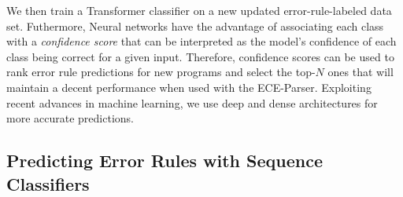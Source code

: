 We then train a Transformer classifier on a new updated error-rule-labeled data
set. Futhermore, Neural networks have the advantage of associating each class
with a \emph{confidence score} that can be interpreted as the model's confidence
of each class being correct for a given input. Therefore, confidence scores can
be used to rank error rule predictions for new programs and select the top-$N$
ones that will maintain a decent performance when used with the ECE-Parser.
Exploiting recent advances in machine learning, we use deep and dense
architectures \citep{Schmidhuber_2015} for more accurate predictions.

\subsection{Predicting Error Rules with Sequence Classifiers}
\label{sec:overview:seq-classifiers}

